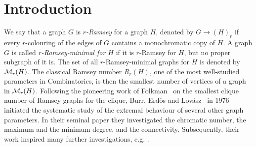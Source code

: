 \documentclass[12pt]{article}
\newcommand{\cM}{{\cal M}}
\theoremstyle{definition}
\begin{document}
	\section{Introduction}
	We say that a graph $G$ is {\em $r$-Ramsey} for a graph $H$, denoted by $G \to (H)_r$ if every $r$-colouring of the edges of $G$ contains a monochromatic copy of $H$.  A graph $G$ is called {\em $r$-Ramsey-minimal for $H$} if it is $r$-Ramsey for $H$, but no proper subgraph of it is. The set of all $r$-Ramsey-minimal graphs for $H$ is denoted by $\cM_r(H)$. The classical Ramsey number $R_r(H)$, one of the %
	most well-studied parameters in Combinatorics, is then the smallest number of vertices of a graph in $\cM_r(H)$. 
	Following the pioneering work of Folkman~\cite{folkman1970graphs} on the smallest clique number of Ramsey graphs for the clique, Burr, Erd\H{o}s and Lov\'asz~\cite{burr1976graphs} in 1976 initiated the systematic study of the extremal behaviour of several other graph parameters. 
	In their seminal paper they investigated the chromatic number, the maximum and the minimum degree, and the connectivity.
	Subsequently, their work inspired many further investigations, e.g. \cite{horn2014degree, jiang2013degree, zhu1998chromatic, rodl2008ramsey,conlon2023three, nevsetvril1976ramsey, folkman1970graphs, fox2016minimum, han,bamberg2022minimum}. 
	
\end{document}
